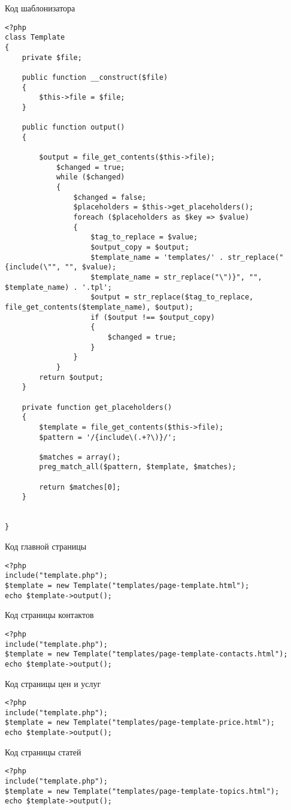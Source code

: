 \hspace{1.25cm} Код шаблонизатора
\begin{verbatim}
<?php
class Template
{
	private $file;
	
	public function __construct($file)
	{
		$this->file = $file;
	}
	
	public function output()
	{

		$output = file_get_contents($this->file);
			$changed = true;
			while ($changed)
			{
				$changed = false;
				$placeholders = $this->get_placeholders();
				foreach ($placeholders as $key => $value)
				{
					$tag_to_replace = $value;
					$output_copy = $output;
					$template_name = 'templates/' . str_replace("{include(\"", "", $value);
					$template_name = str_replace("\")}", "", $template_name) . '.tpl';
					$output = str_replace($tag_to_replace, file_get_contents($template_name), $output);
					if ($output !== $output_copy)
					{
						$changed = true;
					}
				}
			}		
		return $output;
	}
	
	private function get_placeholders()
	{
		$template = file_get_contents($this->file);
		$pattern = '/{include\(.+?\)}/';
		
		$matches = array();
		preg_match_all($pattern, $template, $matches);
	
		return $matches[0];
	}

	
}	
\end{verbatim}

Код главной страницы
\begin{verbatim}
<?php
include("template.php");
$template = new Template("templates/page-template.html");
echo $template->output();
\end{verbatim}


Код страницы контактов
\begin{verbatim}
<?php
include("template.php");
$template = new Template("templates/page-template-contacts.html");
echo $template->output();
\end{verbatim}


Код страницы цен и услуг
\begin{verbatim}
<?php
include("template.php");
$template = new Template("templates/page-template-price.html");
echo $template->output();
\end{verbatim}


Код страницы статей
\begin{verbatim}
<?php
include("template.php");
$template = new Template("templates/page-template-topics.html");
echo $template->output();
\end{verbatim}


